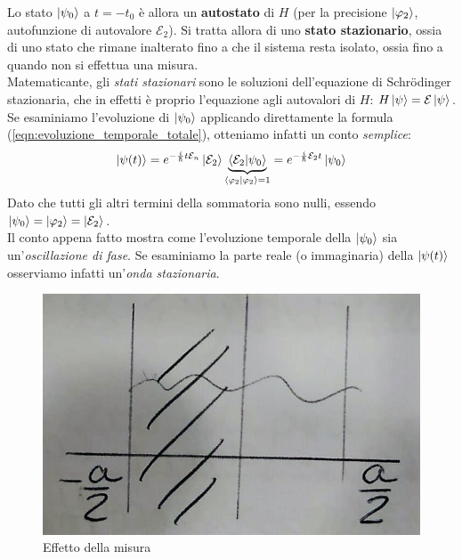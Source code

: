 \documentclass[../../FisicaTeorica.tex]{subfiles}
\begin{document}
\begin{enumerate}
Lo stato $\ket{\psi_0}$ a $t=-t_0$ è allora un \textbf{autostato} di $H$ (per la precisione $\ket{\varphi_2}$, autofunzione di autovalore $\mathcal{E}_2$). Si tratta allora di uno \textbf{stato stazionario}, ossia di uno stato che rimane inalterato fino a che il sistema resta isolato, ossia fino a quando non si effettua una misura.\\
Matematicante, gli \textit{stati stazionari} sono le soluzioni dell'equazione di Schr\"odinger stazionaria, che in effetti è proprio l'equazione agli autovalori di $H$: $H\ket{\psi}=\mathcal{E}\ket{\psi}$.\\
Se esaminiamo l'evoluzione di $\ket{\psi_0}$ applicando direttamente la formula (\ref{eqn:evoluzione_temporale_totale}), otteniamo infatti un conto \textit{semplice}:
\[
\ket{\psi(t)}=e^{-\frac{i}{\hbar}t\mathcal{E}_n} \ket{\mathcal{E}_2}\underbrace{\braket{\mathcal{E}_2|\psi_0}}_{\braket{\varphi_2|\varphi_2}=1} = e^{-\frac{i}{\hbar}\mathcal{E}_2 t} \ket{\psi_0}
\]
Dato che tutti gli altri termini della sommatoria sono nulli, essendo $\ket{\psi_0}=\ket{\varphi_2}=\ket{\mathcal{E}_2}$.\\
Il conto appena fatto mostra come l'evoluzione temporale della $\ket{\psi_0}$ sia un'\textit{oscillazione di fase}. Se esaminiamo la parte reale (o immaginaria) della $\ket{\psi(t)}$ osserviamo infatti un'\textit{onda stazionaria}.
\\
\begin{figure}[H]
\centering
\includegraphics[scale=0.4]{Immagini/15_11/img1.jpeg}
\caption{Effetto della misura}
\end{figure}


\end{enumerate}
\end{document}
